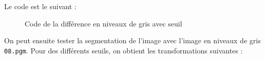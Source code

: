 \documentclass[french,a4paper,10pt]{article}
\begin{document}
	Le code est le suivant : %
	\begin{figure}[!htb]
		\centering
		\caption{Code de la différence en niveaux de gris avec seuil}\label{Fig:difference-grey-seuil-code}
	\end{figure}

	On peut ensuite tester la segmentation de l'image avec l'image en niveaux de gris \texttt{08.pgm}.
	Pour des différents seuils, on obtient les transformations suivantes :
\end{document}
